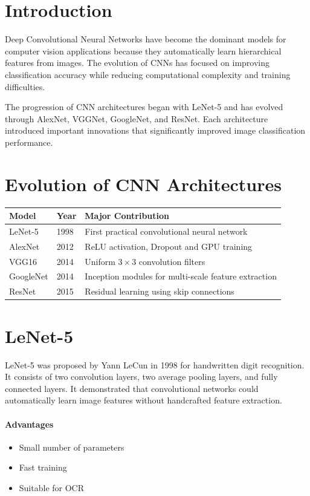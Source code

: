 \documentclass[11pt]{article}
\begin{document}
\section{Introduction}
Deep Convolutional Neural Networks have become the dominant models for computer vision applications because they automatically learn hierarchical features from images. The evolution of CNNs has focused on improving classification accuracy while reducing computational complexity and training difficulties.

The progression of CNN architectures began with LeNet-5 and has evolved through AlexNet, VGGNet, GoogleNet, and ResNet. Each architecture introduced important innovations that significantly improved image classification performance.

\section{Evolution of CNN Architectures}
\begin{table}[H]
\centering
\begin{tabular}{|l|l|p{8cm}|}
\hline
\textbf{Model} & \textbf{Year} & \textbf{Major Contribution} \\ \hline
LeNet-5 & 1998 & First practical convolutional neural network \\ \hline
AlexNet & 2012 & ReLU activation, Dropout and GPU training \\ \hline
VGG16 & 2014 & Uniform $3 \times 3$ convolution filters \\ \hline
GoogleNet & 2014 & Inception modules for multi-scale feature extraction \\ \hline
ResNet & 2015 & Residual learning using skip connections \\ \hline
\end{tabular}
\end{table}

\section{LeNet-5}
LeNet-5 was proposed by Yann LeCun in 1998 for handwritten digit recognition. It consists of two convolution layers, two average pooling layers, and fully connected layers. It demonstrated that convolutional networks could automatically learn image features without handcrafted feature extraction.

\paragraph{Advantages}
\begin{itemize}[leftmargin=*]
    \item Small number of parameters
    \item Fast training
    \item Suitable for OCR
\end{itemize}
\end{document}
